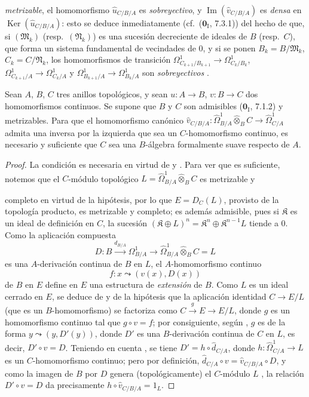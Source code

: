 \begin{env}[20.7.17]
\emph{metrizable}, el homomorfismo $\widehat u_{C/B/A}$ es \emph{sobreyectivo},
y $\operatorname{Im}(\widehat v_{C/B/A})$ es \emph{densa} en
$\operatorname{Ker}(\widehat u_{C/B/A})$: esto se deduce inmediatamente
(cf.\ ($\mathbf{0}_{\mathrm I}$, 7.3.1)) del hecho de que, si
$(\mathfrak{M}_k)$ (resp.\ $(\mathfrak{N}_k)$) es una sucesión decreciente
de ideales de $B$ (resp.\ $C$), que forma un sistema fundamental de vecindades
de $0$, y si se ponen $B_k=B/\mathfrak{M}_k$, $C_k=C/\mathfrak{N}_k$, los
homomorfismos de transición
$\Omega^1_{C_{k+1}/B_{k+1}}\to\Omega^1_{C_k/B_k}$,
$\Omega^1_{C_{k+1}/A}\to\Omega^1_{C_k/A}$ y
$\Omega^1_{B_{k+1}/A}\to\Omega^1_{B_k/A}$ son \emph{sobreyectivos}
.
\end{env}

\begin{proposition}[20.7.18]
\label{0.20.7.18-fr}
Sean $A$, $B$, $C$ tres anillos topológicos, y sean $u:A\to B$, $v:B\to C$
dos homomorfismos continuos. Se supone que $B$ y $C$ son admisibles
\textup{($\mathbf{0}_{\mathrm I}$, 7.1.2)} y metrizables. Para que el homomorfismo
canónico
$\widehat v_{C/B/A}:\widehat{\Omega}^1_{B/A}\widehat\otimes_B C\to\widehat{\Omega}^1_{C/A}$
admita una inversa por la izquierda que sea un $C$-homomorfismo continuo, es
necesario y suficiente que $C$ sea una $B$-álgebra formalmente suave respecto
de $A$.
\end{proposition}

\begin{proof}
La condición es necesaria en virtud de  y
. Para ver que es suficiente, notemos que el $C$-módulo
topológico
$L=\widehat{\Omega}^1_{B/A}\widehat\otimes_B C$ es
metrizable y

completo en virtud de la hipótesis, por lo que
$E=D_C(L)$, provisto de la topología producto, es 
metrizable y completo; es
además admisible, pues si $\mathfrak{K}$ es un ideal de definición en $C$, la
sucesión $(\mathfrak{K}\oplus L)^n=\mathfrak{K}^n\oplus\mathfrak{K}^{n-1}L$
tiende a $0$. Como la aplicación compuesta
\[
  D:B\xrightarrow{d_{B/A}}\Omega^1_{B/A}\to
  \widehat{\Omega}^1_{B/A}\widehat\otimes_B C=L
\]
es una $A$-derivación continua de $B$ en $L$, el $A$-homomorfismo continuo
\[
  f:x\leadsto(v(x),D(x))
\]
de $B$ en $E$ define en $E$ una estructura de \emph{extensión} de $B$. Como $L$ es
un ideal cerrado en $E$, se deduce de  y de la hipótesis que
la aplicación identidad $C\to E/L$ (que es un $B$-homomorfismo) se factoriza
como $C\xrightarrow{g}E\to E/L$, donde $g$ es un homomorfismo continuo tal
que $g\circ v=f$; por consiguiente, según , $g$ es de la
forma $y\leadsto(y,D'(y))$, donde $D'$ es una $B$-derivación continua de $C$ en
$L$, es decir, $D'\circ v=D$. Teniendo en cuenta , se
tiene $D'=h\circ\widehat d_{C/A}$, donde
$h:\widehat{\Omega}^1_{C/A}\to L$ es un $C$-homomorfismo continuo; pero por
definición, $\widehat d_{C/A}\circ v=\widehat v_{C/B/A}\circ D$, y como la
imagen de $B$ por $D$ genera (topológicamente) el $C$-módulo $L$
, la relación $D'\circ v=D$ da precisamente
$h\circ\widehat v_{C/B/A}=1_L$.
\end{proof}

